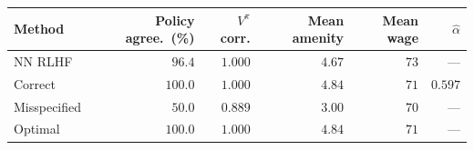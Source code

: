 \begin{tabular}{lrrrrr}
\hline
Method & Policy agree.~(\%) & $V^\pi$ corr. & Mean amenity & Mean wage & $\hat{\alpha}$ \\
\hline
NN RLHF & $96.4$ & $1.000$ & $4.67$ & $73$ & --- \\
Correct & $100.0$ & $1.000$ & $4.84$ & $71$ & $0.597$ \\
Misspecified & $50.0$ & $0.889$ & $3.00$ & $70$ & --- \\
\hline
Optimal & $100.0$ & $1.000$ & $4.84$ & $71$ & --- \\
\hline
\end{tabular}

